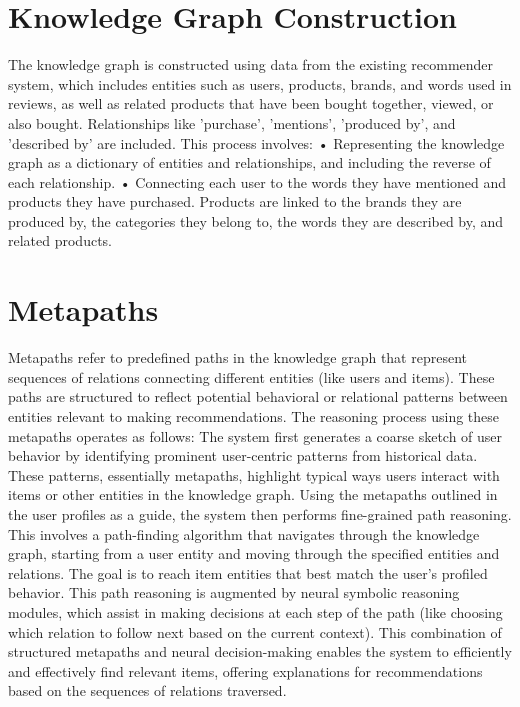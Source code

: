 \section{Knowledge Graph Construction}
The knowledge graph is constructed using data from the existing recommender system, which includes entities such as users, products, brands, and words used in reviews, as well as related products that have been bought together, viewed, or also bought. Relationships like 'purchase', 'mentions', 'produced by', and 'described by' are included. This process involves:
•	Representing the knowledge graph as a dictionary of entities and relationships, and including the reverse of each relationship.
•	Connecting each user to the words they have mentioned and products they have purchased. Products are linked to the brands they are produced by, the categories they belong to, the words they are described by, and related products.


\section{Metapaths}
Metapaths refer to predefined paths in the knowledge graph that represent sequences of relations connecting different entities (like users and items). These paths are structured to reflect potential behavioral or relational patterns between entities relevant to making recommendations. The reasoning process using these metapaths operates as follows: The system first generates a coarse sketch of user behavior by identifying prominent user-centric patterns from historical data. These patterns, essentially metapaths, highlight typical ways users interact with items or other entities in the knowledge graph. Using the metapaths outlined in the user profiles as a guide, the system then performs fine-grained path reasoning. This involves a path-finding algorithm that navigates through the knowledge graph, starting from a user entity and moving through the specified entities and relations. The goal is to reach item entities that best match the user’s profiled behavior. This path reasoning is augmented by neural symbolic reasoning modules, which assist in making decisions at each step of the path (like choosing which relation to follow next based on the current context). This combination of structured metapaths and neural decision-making enables the system to efficiently and effectively find relevant items, offering explanations for recommendations based on the sequences of relations traversed.


